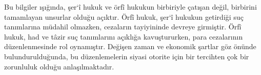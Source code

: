 Bu bilgiler ışığında, şer`î hukuk ve örfî hukukun birbiriyle çatışan değil, birbirini tamamlayan unsurlar olduğu açıktır. Örfî hukuk, şer`î hukukun getirdiği suç tanımlarına müdahil olmazken, cezaların tayiyininde 
devreye girmiştir. Örfî hukuk, had ve tâzir suç tanımlarını açıklığa kavuştururken, para cezalarının düzenlenmesinde rol oynamıştır. Değişen zaman ve ekonomik şartlar göz önünde bulundurulduğunda, bu düzenlemelerin 
siyasi otorite için bir tercihten çok bir zorunluluk olduğu anlaşılmaktadır.